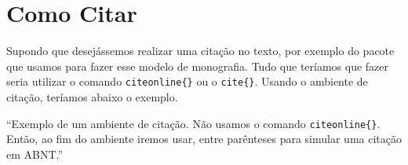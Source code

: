 
\chapter{Como Citar}
\label{cap:cite}

Supondo que desejássemos realizar uma citação no texto, por exemplo do pacote que usamos para fazer esse modelo de monografia. Tudo que teríamos que fazer seria utilizar o comando \texttt{citeonline\{\}} ou o \texttt{cite\{\}}. Usando o ambiente de citação, teríamos abaixo o exemplo.\cite{osbourne2009ozzy}

\begin{citacao}
	``Exemplo de um ambiente de citação. Não usamos o comando \texttt{citeonline\{\}}. Então, ao fim do ambiente iremos usar, entre parênteses para simular uma citação em ABNT.'' 
\end{citacao}
